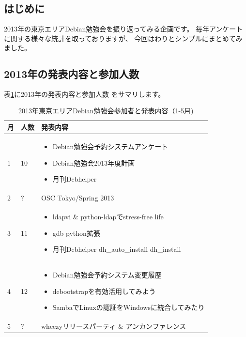 \documentclass[mingoth,a4paper]{jsarticle}
\begin{document}


\subsection{はじめに}

 2013年の東京エリアDebian勉強会を振り返ってみる企画です。
 毎年アンケートに関する様々な統計を取っておりますが、
今回はわりとシンプルにまとめてみました。

\subsection{2013年の発表内容と参加人数}

 表\ref{tab:debian-meeting-summary}に2013年の発表内容と参加人数
をサマリします。

\begin{table}[ht]
\begin{center}
\begin{tabular}{|l|l|p{10cm}|}
\hline 
月&人数&発表内容 \\ \hline \hline
1& 10 & 
\begin{itemize}
\item Debian勉強会予約システムアンケート
\item Debian勉強会2013年度計画
\item 月刊Debhelper
\end{itemize}
\\ \hline
2& ? & OSC Tokyo/Spring 2013 \\ \hline
3& 11 & 
\begin{itemize}
\item ldapvi \& python-ldapでstress-free life
\item gdb python拡張
\item 月刊Debhelper dh\_auto\_install dh\_install
\end{itemize}
\\ \hline
4& 12 &  
\begin{itemize}
\item Debian勉強会予約システム変更履歴
\item debootstrapを有効活用してみよう
\item SambaでLinuxの認証をWindowsに統合してみたり
\end{itemize}
\\ \hline
5& ? & wheezyリリースパーティ \& アンカンファレンス\\
\hline
\end{tabular}
\label{tab:debian-meeting-summary}
\caption{2013年東京エリアDebian勉強会参加者と発表内容（1-5月)}
\end{center}
\end{table}
\end{document}
